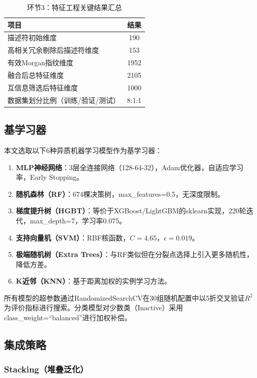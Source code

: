 \documentclass[12pt,a4paper]{article}
\begin{document}
\begin{table}[H]
\centering
\caption{环节3：特征工程关键结果汇总}
\label{tab:phase3_feature_engineering}
\begin{tabular}{lc}
\toprule
项目 & 结果 \\
\midrule
描述符初始维度 & 190 \\
高相关冗余剔除后描述符维度 & 153 \\
有效Morgan指纹维度 & 1952 \\
融合后总特征维度 & 2105 \\
互信息筛选后特征维度 & 1000 \\
数据集划分比例（训练/验证/测试） & 8:1:1 \\
\bottomrule
\end{tabular}
\end{table}

\subsection{基学习器}

本文选取以下6种异质机器学习模型作为基学习器：

\begin{enumerate}[leftmargin=2em]
    \item \textbf{MLP神经网络}：3层全连接网络（128-64-32），Adam优化器，自适应学习率，Early Stopping。
    \item \textbf{随机森林（RF）}：674棵决策树，max\_features=0.5，无深度限制。
    \item \textbf{梯度提升树（HGBT）}：等价于XGBoost/LightGBM的sklearn实现，220轮迭代，max\_depth=7，学习率0.075。
    \item \textbf{支持向量机（SVM）}：RBF核函数，$C=4.65$，$\epsilon=0.019$。
    \item \textbf{极端随机树（Extra Trees）}：与RF类似但在分裂点选择上引入更多随机性，降低方差。
    \item \textbf{K近邻（KNN）}：基于距离加权的实例学习方法。
\end{enumerate}

所有模型的超参数通过RandomizedSearchCV在30组随机配置中以5折交叉验证$R^2$为评价指标进行搜索。分类模型对少数类（Inactive）采用class\_weight=``balanced''进行加权补偿。

\subsection{集成策略}

\subsubsection{Stacking（堆叠泛化）}
\end{document}
